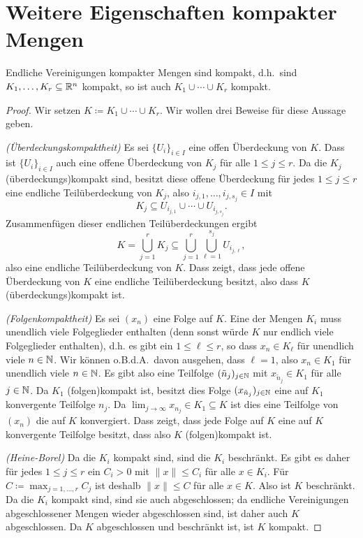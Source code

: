 \documentclass[a4paper,10pt]{article}
\begin{document}
\section{Weitere Eigenschaften kompakter Mengen}


\begin{lem}
 Endliche Vereinigungen kompakter Mengen sind kompakt, d.h.\ sind $K_1, \dotsc, K_r \subseteq \mathbb{R}^n$ kompakt, so ist auch $K_1 \cup \dotsb \cup K_r$ kompakt.
\end{lem}
\begin{proof}
 Wir setzen $K \coloneqq K_1 \cup \dotsb \cup K_r$. Wir wollen drei Beweise für diese Aussage geben.
 
 \emph{(Überdeckungskompaktheit)} Es sei $\{U_i\}_{i \in I}$ eine offen Überdeckung von $K$. Dass ist $\{U_i\}_{i \in I}$ auch eine offene Überdeckung von $K_j$ für alle $1 \leq j \leq r$. Da die $K_j$ (überdeckungs)kompakt sind, besitzt diese offene Überdeckung für jedes $1 \leq j \leq r$ eine endliche Teilüberdeckung von $K_j$, also $i_{j,1}, \dotsc, i_{j,s_j} \in I$ mit
 \[
  K_j \subseteq U_{i_{j,1}} \cup \dotsb \cup U_{i_{j,s_j}}.
 \]
 Zusammenfügen dieser endlichen Teilüberdeckungen ergibt
 \[
  K
  = \bigcup_{j=1}^r K_j
  \subseteq \bigcup_{j=1}^r \bigcup_{\ell=1}^{s_j} U_{i_{j,\ell}},
 \]
 also eine endliche Teilüberdeckung von $K$. Dass zeigt, dass jede offene Überdeckung von $K$ eine endliche Teilüberdeckung besitzt, also dass $K$ (über\-deck\-ungs)kom\-pakt ist.
 
 \emph{(Folgenkompaktheit)} Es sei $(x_n)$ eine Folge auf $K$. Eine der Mengen $K_i$ muss unendlich viele Folgeglieder enthalten (denn sonst würde $K$ nur endlich viele Folgeglieder enthalten), d.h. es gibt ein $1 \leq \ell \leq r$, so dass $x_n \in K_\ell$ für unendlich viele $n \in \mathbb{N}$. Wir können o.B.d.A.\ davon ausgehen, dass $\ell = 1$, also $x_n \in K_1$ für unendlich viele $n \in \mathbb{N}$. Es gibt also eine Teilfolge $(\tilde{n}_j)_{j \in \mathbb{N}}$ mit $x_{\tilde{n}_j} \in K_1$ für alle $j \in \mathbb{N}$. Da $K_1$ (folgen)kompakt ist, besitzt dies Folge $(x_{\tilde{n}_j})_{j \in \mathbb{N}}$ eine auf $K_1$ konvergente Teilfolge $n_j$. Da $\lim_{j \to \infty} x_{n_j} \in K_1 \subseteq K$ ist dies eine Teilfolge von $(x_n)$ die auf $K$ konvergiert. Dass zeigt, dass jede Folge auf $K$ eine auf $K$ konvergente Teilfolge besitzt, dass also $K$ (folgen)kompakt ist.
 
 \emph{(Heine-Borel)} Da die $K_i$ kompakt sind, sind die $K_i$ beschränkt. Es gibt es daher für jedes $1 \leq j \leq r$ ein $C_i > 0$ mit $\|x\| \leq C_i$ für alle $x \in K_i$. Für $C \coloneqq \max_{j=1,\dotsc,r} C_j$ ist deshalb $\|x\| \leq C$ für alle $x \in K$. Also ist $K$ beschränkt. Da die $K_i$ kompakt sind, sind sie auch abgeschlossen; da endliche Vereinigungen abgeschlossener Mengen wieder abgeschlossen sind, ist daher auch $K$ abgeschlossen. Da $K$ abgeschlossen und beschränkt ist, ist $K$ kompakt.
\end{proof}
\end{document}
